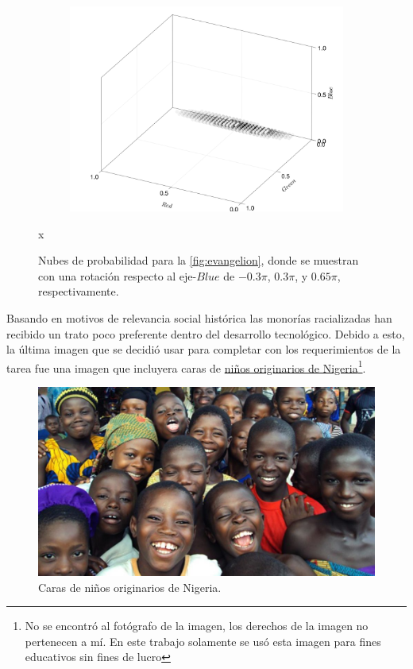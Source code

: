 \begin{figure}[ht!]
\begin{subfigure}[c]{0.3\textwidth}
    \end{subfigure}
    \begin{subfigure}[c]{0.3\textwidth}
        \centering
        \includegraphics[scale=0.09]{../pictures/gaussian_cloud_eva_3}
    \end{subfigure}
    \caption{Nubes de probabilidad para la \cref{fig:evangelion}, donde se muestran con una rotación respecto al eje-$Blue$ de $-0.3\pi$, $0.3\pi$, y $0.65\pi$, respectivamente.}x
    \label{fig:nube-gaussiana-eva}
\end{figure}

Basando en motivos de relevancia social histórica las monorías racializadas \cite{wevers2016kodak} han recibido un trato poco preferente dentro del desarrollo tecnológico. Debido a esto, la última imagen que se decidió usar para completar con los requerimientos de la tarea fue una imagen que incluyera caras de \href{https://guardian.ng/opinion/humanism-and-its-possibilities-in-africa/}{niños originarios de Nigeria}\footnote{No se encontró al fotógrafo de la imagen, los derechos de la imagen no pertenecen a mí. En este trabajo solamente se usó esta imagen para fines educativos sin fines de lucro}.
\begin{figure}[ht!]
    \centering
    \includegraphics[scale=0.25]{../pictures/nigerian-children}
    \caption{Caras de niños originarios de Nigeria.}
    \label{fig:kids}
\end{figure}

